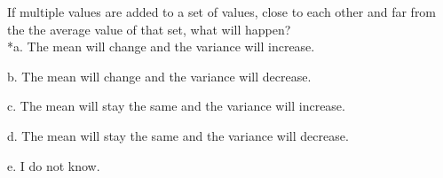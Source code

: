 
If multiple values are added to a set of values, close to each other and far from the the
average value of that set, what will happen?\\

*a. The mean will change and the variance will increase.

b. The mean will change and the variance will decrease.

c. The mean will stay the same and the variance will increase.

d. The mean will stay the same and the variance will decrease.

e. I do not know.\\

